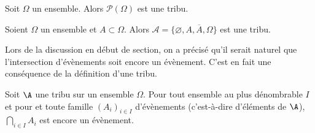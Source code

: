 \documentclass[a4paper,10pt]{report}
\begin{document}
\begin{itemize}
\medskip

\begin{exems}
\item Soit $\Omega$ un ensemble. Alors $\mathcal{P}(\Omega)$ est une tribu.
\item Soient $\Omega$ un ensemble et $A \subset \Omega$. Alors $\mathcal{A} = \lbrace \varnothing, A, \overline{A}, \Omega \rbrace$ est une tribu. 
\end{exems}

\vspace{0.2cm}

Lors de la discussion en début de section, on a précisé qu'il serait naturel que l'intersection d'évènements soit encore un évènement. C'est en fait une conséquence de la définition d'une tribu.

\vspace{0.2cm}


\begin{Proposition}{}
Soit $\A$ une tribu sur un ensemble $\Omega$. Pour tout ensemble au plus dénombrable $I$ et pour et toute famille $(A_i)_{i \in I}$ d'évènements (c'est-à-dire d'éléments de $\A$), $\bigcap_{i \in I} A_i$ est encore un évènement.
\end{Proposition}

\begin{Demonstration}{} 

\vspace{6cm}
%
\end{Demonstration}
%

%
%


\end{itemize}
\end{document}
